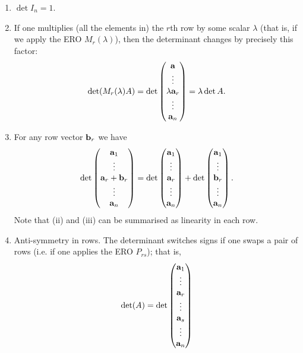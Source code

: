 \documentclass[10pt, a4paper]{article}
\begin{document}
\begin{enumerate}[label = (\roman*)]
    \item $\det I_n = 1$.
    \item If one multiplies
    (all the elements in)
    the $r$th row by some scalar $\lambda$
    (that is, if we apply the ERO $M_r(\lambda)$),
    then the determinant changes by precisely this factor:
    \[
    \det(M_r(\lambda)A) = \det\begin{pmatrix}
        \mathbf{a} \\ \vdots \\ \lambda\mathbf{a}_r \\ \vdots \\ \mathbf{a}_n
    \end{pmatrix} = \lambda\det A.
    \]
    \item For any row vector $\mathbf{b}_r$ we have
    \[
    \det\begin{pmatrix}
        \mathbf{a}_1 \\ \vdots \\ \mathbf{a}_r + \mathbf{b}_r \\ \vdots \\ \mathbf{a}_n
    \end{pmatrix} =
    \det \begin{pmatrix}
        \mathbf{a}_1 \\ \vdots \\ \mathbf{a}_r \\ \vdots \\ \mathbf{a}_n
    \end{pmatrix}
    +
    \det\begin{pmatrix}
        \mathbf{a}_1 \\ \vdots \\ \mathbf{b}_r \\ \vdots \\ \mathbf{a}_n
    \end{pmatrix}.
    \]
    Note that (ii) and (iii) can be summarised as linearity in each row.
    \item Anti-symmetry in rows.
    The determinant switches signs if one swaps a pair of rows (i.e. if one applies the ERO $P_{rs}$);
    that is,
    \[
    \det(A) = \det\begin{pmatrix}
        \mathbf{a}_1 \\ \vdots \\ \mathbf{a}_r \\ \vdots \\ \mathbf{a}_s \\ \vdots \\ \mathbf{a}_n

\end{pmatrix}\]
\end{enumerate}
\end{document}
